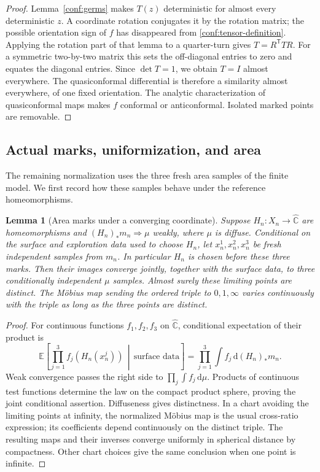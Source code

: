 \documentclass[11pt]{article}
\numberwithin{equation}{section}
\newtheorem{lemma}[theorem]{Lemma}
\theoremstyle{definition}
\theoremstyle{remark}
\newcommand{\EE}{\mathbb E}
\newcommand{\Chat}{\widehat{\mathbb C}}
\newcommand{\dd}{\mathrm d}
\newcommand{\1}{\mathbf 1}
\begin{document}
\begin{proof}
Lemma~\ref{conf:germs} makes \(T(z)\) deterministic for almost
every deterministic \(z\).  A coordinate rotation conjugates it
by the rotation matrix; the possible orientation sign of \(f\)
has disappeared from \eqref{conf:tensor-definition}.  Applying
the rotation part of that lemma to a quarter-turn gives
\(T=R^{\mathsf T}TR\).  For a symmetric two-by-two matrix this
sets the off-diagonal entries to zero and equates the diagonal
entries.  Since \(\det T=1\), we obtain \(T=I\) almost
everywhere.  The quasiconformal differential is therefore a
similarity almost everywhere, of one fixed orientation.  The
analytic characterization of quasiconformal maps
\cite[Theorem~2.5.4]{AstalaIwaniecMartin2009} makes \(f\)
conformal or anticonformal.  Isolated marked points are removable.
\end{proof}

\subsection{Actual marks, uniformization, and area}
\label{conf:normalization-subsection}

The remaining normalization uses the three fresh area samples of the
finite model.  We first record how these samples behave under the
reference homeomorphisms.

\begin{lemma}[Area marks under a converging coordinate]
\label{joint:marks}
Suppose $H_n:X_n\to\Chat$ are homeomorphisms and
$(H_n)_*m_n\Rightarrow\mu$ weakly, where $\mu$ is diffuse. Conditional
on the surface and exploration data used to choose $H_n$, let
$x_n^1,x_n^2,x_n^3$ be fresh independent samples from $m_n$. In
particular $H_n$ is chosen before these three marks. Then their images
converge jointly, together with the surface data, to three conditionally independent $\mu$ samples.
Almost surely these limiting points are distinct. The M\"obius map
sending the ordered triple to $0,1,\infty$ varies continuously with
the triple as long as the three points are distinct.
\end{lemma}

\begin{proof}
For continuous functions $f_1,f_2,f_3$ on $\Chat$, conditional
expectation of their product is
\[
 \EE\!\left[\prod_{j=1}^3 f_j(H_n(x_n^j))\,
        \middle|\,\text{surface data}\right]
   =\prod_{j=1}^3\int f_j\,\dd(H_n)_*m_n.
\]
Weak convergence passes the right side to
$\prod_j\int f_j\,\dd\mu$. Products of continuous test functions
determine the law on the compact product sphere, proving the joint
conditional assertion. Diffuseness gives distinctness. In a chart
avoiding the limiting points at infinity, the normalized M\"obius
map is the usual cross-ratio expression; its coefficients depend
continuously on the distinct triple. The resulting maps and their
inverses converge uniformly in spherical distance by compactness.
Other chart choices give the same conclusion when one point is
infinite.
\end{proof}
\end{document}
